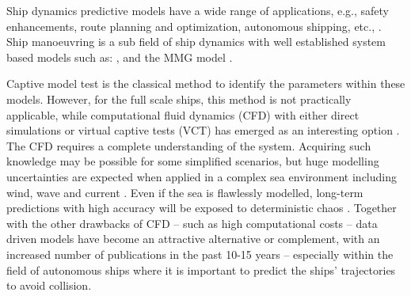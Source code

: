 Ship dynamics predictive models have a wide range of applications, e.g., safety enhancements, route planning and optimization, autonomous shipping, etc., \citep{aslam_internet_2020}.
Ship manoeuvring is a sub field of ship dynamics with well established system based models such as: \citet{abkowitz_ship_1964,nomoto_steering_1957,norrbin_theory_1971}, and the MMG model \citep{yasukawa_introduction_2015}.

Captive model test is the classical method to identify the parameters within these models. However, for the full scale ships, this method is not practically applicable, while computational fluid dynamics (CFD) with either direct simulations or virtual captive tests (VCT) has emerged as an interesting option \citep{liu_predictions_2018,li_ship_2022}.
The CFD requires a complete understanding of the system. Acquiring such knowledge may be possible for some simplified scenarios, but huge modelling uncertainties are expected when applied in a complex sea environment including wind, wave and current \citep{miller_ship_2021}. 
Even if the sea is flawlessly modelled, long-term predictions with high accuracy will be exposed to deterministic chaos \citep{lorenz_deterministic_1963}.
Together with the other drawbacks of CFD -- such as high computational costs -- data driven models have become an attractive alternative or complement, with an increased number of publications in the past 10-15 years %
-- especially within the field of autonomous ships \citep{ahmed_survey_2023} where it is important to predict the ships’ trajectories to avoid collision. 

